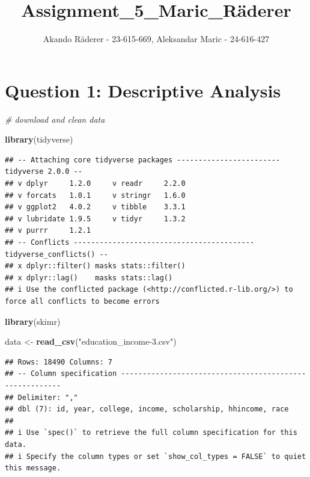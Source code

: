 \documentclass[
]{article}
\title{Assignment\_5\_Maric\_Räderer}
\author{Akando Räderer - 23-615-669, Aleksandar Maric - 24-616-427}
\date{}
\newenvironment{Shaded}{\begin{snugshade}}{\end{snugshade}}
\newcommand{\CommentTok}[1]{\textcolor[rgb]{0.56,0.35,0.01}{\textit{#1}}}
\newcommand{\FunctionTok}[1]{\textcolor[rgb]{0.13,0.29,0.53}{\textbf{#1}}}
\newcommand{\NormalTok}[1]{#1}
\newcommand{\OtherTok}[1]{\textcolor[rgb]{0.56,0.35,0.01}{#1}}
\newcommand{\StringTok}[1]{\textcolor[rgb]{0.31,0.60,0.02}{#1}}
\begin{document}
\maketitle

{
\setcounter{tocdepth}{3}
\tableofcontents
}
\section{Question 1: Descriptive
Analysis}\label{question-1-descriptive-analysis}

\begin{Shaded}
\begin{Highlighting}[]
\CommentTok{\# download and clean data}

\FunctionTok{library}\NormalTok{(tidyverse)}
\end{Highlighting}
\end{Shaded}

\begin{verbatim}
## -- Attaching core tidyverse packages ------------------------ tidyverse 2.0.0 --
## v dplyr     1.2.0     v readr     2.2.0
## v forcats   1.0.1     v stringr   1.6.0
## v ggplot2   4.0.2     v tibble    3.3.1
## v lubridate 1.9.5     v tidyr     1.3.2
## v purrr     1.2.1     
## -- Conflicts ------------------------------------------ tidyverse_conflicts() --
## x dplyr::filter() masks stats::filter()
## x dplyr::lag()    masks stats::lag()
## i Use the conflicted package (<http://conflicted.r-lib.org/>) to force all conflicts to become errors
\end{verbatim}

\begin{Shaded}
\begin{Highlighting}[]
\FunctionTok{library}\NormalTok{(skimr)}

\NormalTok{data }\OtherTok{\textless{}{-}} \FunctionTok{read\_csv}\NormalTok{(}\StringTok{"education\_income{-}3.csv"}\NormalTok{)}
\end{Highlighting}
\end{Shaded}

\begin{verbatim}
## Rows: 18490 Columns: 7
## -- Column specification --------------------------------------------------------
## Delimiter: ","
## dbl (7): id, year, college, income, scholarship, hhincome, race
## 
## i Use `spec()` to retrieve the full column specification for this data.
## i Specify the column types or set `show_col_types = FALSE` to quiet this message.
\end{verbatim}
\end{document}
